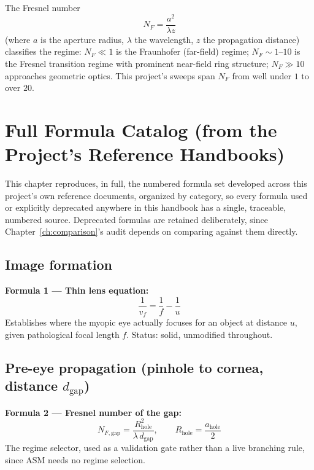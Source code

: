 \documentclass[11pt]{report}
\newcommand{\ahole}{a_{\text{hole}}}
\newcommand{\dgap}{d_{\text{gap}}}
\newcommand{\vf}{v_f}
\begin{document}
The Fresnel number
\begin{equation}
N_F = \frac{a^2}{\lambda z}
\label{eq:fresnelnumber}
\end{equation}
(where $a$ is the aperture radius, $\lambda$ the wavelength, $z$ the propagation distance) classifies the regime: $N_F \ll 1$ is the Fraunhofer (far-field) regime; $N_F \sim 1$--$10$ is the Fresnel transition regime with prominent near-field ring structure; $N_F \gg 10$ approaches geometric optics. This project's sweeps span $N_F$ from well under $1$ to over $20$.

\chapter{Full Formula Catalog (from the Project's Reference Handbooks)}
\label{ch:formulas}

This chapter reproduces, in full, the numbered formula set developed across this project's own reference documents, organized by category, so every formula used or explicitly deprecated anywhere in this handbook has a single, traceable, numbered source. Deprecated formulas are retained deliberately, since Chapter~\ref{ch:comparison}'s audit depends on comparing against them directly.

\section{Image formation}
\textbf{Formula 1 --- Thin lens equation:}
\begin{equation}
\frac{1}{\vf} = \frac{1}{f} - \frac{1}{u}
\label{eq:thinlens}
\end{equation}
Establishes where the myopic eye actually focuses for an object at distance $u$, given pathological focal length $f$. Status: solid, unmodified throughout.

\section{Pre-eye propagation (pinhole to cornea, distance $\dgap$)}

\textbf{Formula 2 --- Fresnel number of the gap:}
\begin{equation}
N_{F,\text{gap}} = \frac{R_{\text{hole}}^2}{\lambda\, \dgap}, \qquad R_{\text{hole}} = \frac{\ahole}{2}
\label{eq:fresnelgap}
\end{equation}
The regime selector, used as a validation gate rather than a live branching rule, since ASM needs no regime selection.
\end{document}
